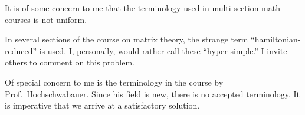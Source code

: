 \documentclass{article}
\begin{document}
It is of some concern to me   that 
the terminology used in  multi-section
 math courses is not uniform.

In several sections of the course on 
matrix theory, the strange term   
 ``hamiltonian-reduced'' is used. 
  I, personally, would rather call these ``hyper-simple.'' I
invite others to comment on this  problem.

Of special concern to me is the terminology in the course 
by Prof.~Hochschwabauer.
  Since his field is new, there is
 no accepted
terminology.   It is imperative 
that we arrive at a satisfactory solution.
\end{document}
